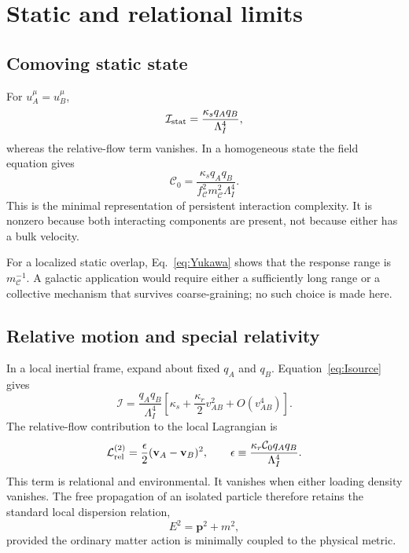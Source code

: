 \documentclass[11pt]{article}
\newcommand{\Lag}{\mathcal L}
\begin{document}
\section{Static and relational limits}

\subsection{Comoving static state}

For $u_A^\mu=u_B^\mu$,
\begin{equation}
\mathcal I_{\rm stat}
=\frac{\kappa_s q_Aq_B}{\Lambda_I^4},
\label{eq:Istatic}
\end{equation}
whereas the relative-flow term vanishes.  In a homogeneous state the field equation gives
\begin{equation}
\mathcal C_0
=\frac{\kappa_s q_Aq_B}
{f_{\mathcal C}^2m_{\mathcal C}^2\Lambda_I^4}.
\label{eq:C0}
\end{equation}
This is the minimal representation of persistent interaction complexity.  It is nonzero because both interacting components are present, not because either has a bulk velocity.

For a localized static overlap, Eq.~\eqref{eq:Yukawa} shows that the response range is $m_{\mathcal C}^{-1}$.  A galactic application would require either a sufficiently long range or a collective mechanism that survives coarse-graining; no such choice is made here.

\subsection{Relative motion and special relativity}

In a local inertial frame, expand about fixed $q_A$ and $q_B$.  Equation~\eqref{eq:Isource} gives
\begin{equation}
\mathcal I
=\frac{q_Aq_B}{\Lambda_I^4}
\left[
\kappa_s+\frac{\kappa_r}{2}v_{AB}^2+O(v_{AB}^4)
\right].
\label{eq:Ilowv}
\end{equation}
The relative-flow contribution to the local Lagrangian is
\begin{equation}
\Lag_{\rm rel}^{(2)}
=\frac{\epsilon}{2}
(\mathbf v_A-\mathbf v_B)^2,
\qquad
\epsilon
\equiv
\frac{\kappa_r\mathcal C_0q_Aq_B}{\Lambda_I^4}.
\label{eq:Lrel}
\end{equation}
This term is relational and environmental.  It vanishes when either loading density vanishes.  The free propagation of an isolated particle therefore retains the standard local dispersion relation,
\begin{equation}
E^2=\mathbf p^2+m^2,
\label{eq:SRdispersion}
\end{equation}
provided the ordinary matter action is minimally coupled to the physical metric.
\end{document}
